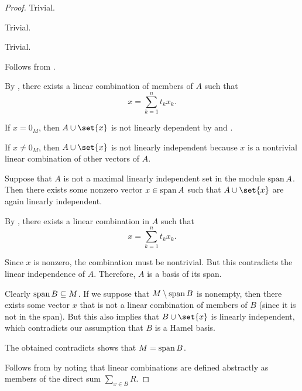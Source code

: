 \begin{proof}
   Trivial.

   Trivial.

   Trivial.

   Follows from .

   By , there exists a linear combination of members of \( A \) such that
  \begin{equation*}
    x = \sum_{k=1}^n t_k x_k.
  \end{equation*}

  If \( x = 0_M \), then \( A \cup \set{ x } \) is not linearly dependent by  and .

  If \( x \neq 0_M \), then \( A \cup \set{ x } \) is not linearly independent because \( x \) is a nontrivial linear combination of other vectors of \( A \).

   Suppose that \( A \) is not a maximal linearly independent set in the module \( \operatorname{span} A \). Then there exists some nonzero vector \( x \in \operatorname{span} A \) such that \( A \cup \set{ x } \) are again linearly independent.

  By , there exists a linear combination in \( A \) such that
  \begin{equation*}
    x = \sum_{k=1}^n t_k x_k.
  \end{equation*}

  Since \( x \) is nonzero, the combination must be nontrivial. But this contradicts the linear independence of \( A \). Therefore, \( A \) is a basis of its span.

   Clearly \( \operatorname{span}{B} \subseteq M \). If we suppose that \( M \setminus \operatorname{span}{B} \) is nonempty, then there exists some vector \( x \) that is not a linear combination of members of \( B \) (since it is not in the span). But this also implies that \( B \cup \set{ x } \) is linearly independent, which contradicts our assumption that \( B \) is a Hamel basis.

  The obtained contradicts shows that \( M = \operatorname{span}{B} \).

   Follows from  by noting that linear combinations are defined abstractly as members of the direct sum \( \sum_{x \in B} R \).
\end{proof}

